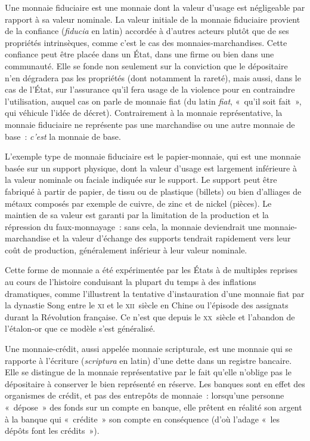 
Une monnaie fiduciaire est une monnaie dont la valeur d'usage est négligeable par rapport à sa valeur nominale. La valeur initiale de la monnaie fiduciaire provient de la confiance (\emph{fiducia} en latin) accordée à d'autres acteurs plutôt que de ses propriétés intrinsèques, comme c'est le cas des monnaies-marchandises. Cette confiance peut être placée dans un État, dans une firme ou bien dans une communauté. Elle se fonde non seulement sur la conviction que le dépositaire n'en dégradera pas les propriétés (dont notamment la rareté), mais aussi, dans le cas de l'État, sur l'assurance qu'il fera usage de la violence pour en contraindre l'utilisation, auquel cas on parle de monnaie fiat (du latin \emph{fiat}, «~qu'il soit fait~», qui véhicule l'idée de décret). Contrairement à la monnaie représentative, la monnaie fiduciaire ne représente pas une marchandise ou une autre monnaie de base~: \emph{c'est} la monnaie de base.


L'exemple type de monnaie fiduciaire est le papier-monnaie, qui est une monnaie basée sur un support physique, dont la valeur d'usage est largement inférieure à la valeur nominale ou faciale indiquée sur le support. Le support peut être fabriqué à partir de papier, de tissu ou de plastique (billets) ou bien d'alliages de métaux composés par exemple de cuivre, de zinc et de nickel (pièces). Le maintien de sa valeur est garanti par la limitation de la production et la répression du faux-monnayage~: sans cela, la monnaie deviendrait une monnaie-marchandise et la valeur d'échange des supports tendrait rapidement vers leur coût de production, généralement inférieur à leur valeur nominale.

Cette forme de monnaie a été expérimentée par les États à de multiples reprises au cours de l'histoire conduisant la plupart du temps à des inflations dramatiques, comme l'illustrent la tentative d'instauration d'une monnaie fiat par la dynastie Song entre le \textsc{xi}\ieme{} et le \textsc{xii}\ieme{}~siècle en Chine ou l'épisode des assignats durant la Révolution française. Ce n'est que depuis le \textsc{xx}\ieme{}~siècle et l'abandon de l'étalon-or que ce modèle s'est généralisé.


Une monnaie-crédit, aussi appelée monnaie scripturale, est une monnaie qui se rapporte à l'écriture (\emph{scriptura} en latin) d'une dette dans un registre bancaire. Elle se distingue de la monnaie représentative par le fait qu'elle n'oblige pas le dépositaire à conserver le bien représenté en réserve. Les banques sont en effet des organismes de crédit, et pas des entrepôts de monnaie~: lorsqu'une personne «~dépose~» des fonds sur un compte en banque, elle prêtent en réalité son argent à la banque qui «~crédite~» son compte en conséquence (d'où l'adage «~les dépôts font les crédits~»).

